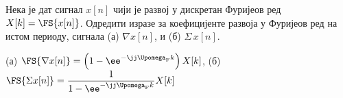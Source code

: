\PID 
Нека је дат сигнал $x[n]$ чији је развој у дискретан Фуријеов ред $X[k] = \FS{x[n]}$. 
Одредити изразе за коефицијенте развоја у Фуријеов ред на истом периоду, сигнала 
(а) $\nabla x[n]$, и (б) $\Sigma \, x[n]$. 

\REZULTAT
(а) 
$\FS{ \nabla x[n] } = 
\left(
    1 - \ee^{-\jj \Upomega_{\rm F} k } 
\right) X[k] $, \qquad
(б) 
$\FS{ \Sigma x[n] } = 
\dfrac{1}{1 - \ee^{-\jj \Upomega_{\rm F} k }} X[k]
$